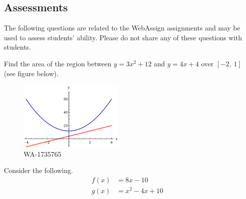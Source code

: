 \documentclass[12pt,addpoints, answers, fleqn]{exam}
\begin{document}
	
\begin{teacher}
\subsection{Assessments}
The following questions are related to the WebAssign assignments and may be used to assess students' ability. Please do not share any of these questions with students.
\begin{questions}		
\question 	%

Find the area of the region between $y = 3x^2 + 12$ and $y = 4x + 4$ over $\left[-2,  \ 1\right]$ (see figure below).
\begin{figure}[htbp] %
   \centering
   \includegraphics[width=2in]{./graphics/1735765.pdf} 
   \caption{WA-1735765}
   \label{fig:1735765}
\end{figure}
 \begin{solution}
 \end{solution}
 
\question 	%

Consider the following.
\begin{align*}
f\left(x\right) &= 8x - 10\\
g\left(x\right) &= x^2 - 4x + 10
\end{align*}


\end{questions}
\end{teacher}
\end{document}
